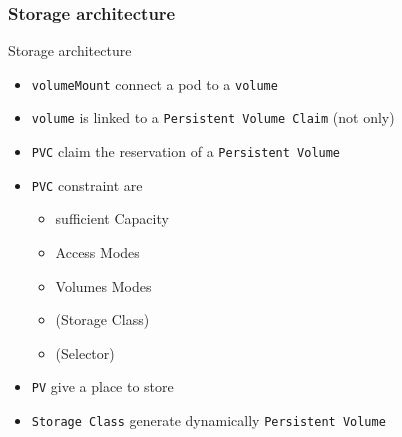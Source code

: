 \subsubsection{Storage architecture}
\begin{frame}[fragile]{Storage architecture}
  \begin{itemize}
    \item \texttt{volumeMount} connect a pod to a \texttt{volume}
    \item \texttt{volume} is linked to a \texttt{Persistent Volume Claim} (not only)
    \item \texttt{PVC} claim the reservation of a \texttt{Persistent Volume}
    \item \texttt{PVC} constraint are
    \begin{itemize}
      \item sufficient Capacity
      \item Access Modes
      \item Volumes Modes
      \item (Storage Class)
      \item (Selector)
    \end{itemize}
    \item \texttt{PV} give a place to store
    \item \texttt{Storage Class} generate dynamically \texttt{Persistent Volume}
  \end{itemize}
\end{frame}

